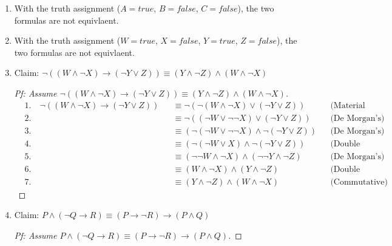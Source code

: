 \documentclass{article}
\begin{document}
\begin{enumerate}
\begin{enumerate}
\begin{proof}[Pf: Assume $(A \rightarrow B) \rightarrow C \equiv (\neg A \rightarrow C) \land (B \rightarrow C)$]
\begin{align*}
                &5. \quad && \equiv (A \lor C) \land (\neg B \lor C) && \text{(Double Negation)} \\
                &6. \quad && \equiv (A \land \neg B) \lor C && \text{(Distributive)}
            \end{align*}
        \end{proof}
        \item With the truth assignment ($A = true$, $B = false$, $C = false$), the two formulas are not equivlaent.
        \item With the truth assignment ($W = true$, $X = false$, $Y = true$, $Z = false$), the two formulas are not equivlaent.
        \item
        Claim: $\neg ((W \land \neg X) \rightarrow (\neg Y \lor Z)) \equiv (Y \land \neg Z) \land (W \land \neg X)$
        \begin{proof}[Pf: Assume $\neg ((W \land \neg X) \rightarrow (\neg Y \lor Z)) \equiv (Y \land \neg Z) \land (W \land \neg X)$]
            \begin{align*}
                &1. \quad \neg ((W \land \neg X) \rightarrow (\neg Y \lor Z)) && \equiv \neg (\neg (W \land \neg X) \lor (\neg Y \lor Z)) && \text{(Material Implication)} \\
                &2. \quad && \equiv \neg ((\neg W \lor \neg \neg X) \lor (\neg Y \lor Z)) && \text{(De Morgan's)} \\
                &3. \quad && \equiv (\neg (\neg W \lor \neg \neg X) \land \neg (\neg Y \lor Z)) && \text{(De Morgan's)} \\
                &4. \quad && \equiv (\neg (\neg W \lor X) \land \neg (\neg Y \lor Z)) && \text{(Double Negation)} \\
                &5. \quad && \equiv (\neg \neg W \land \neg X) \land (\neg \neg Y \land \neg Z) && \text{(De Morgan's)} \\
                &6. \quad && \equiv (W \land \neg X) \land (Y \land \neg Z) && \text{(Double Negation)} \\
                &7. \quad && \equiv (Y \land \neg Z) \land (W \land \neg X) && \text{(Commutative)}
            \end{align*}
        \end{proof}
        \item
        Claim: $P \land (\neg Q \rightarrow R) \equiv (P \rightarrow \neg R) \rightarrow (P \land Q)$
        \begin{proof}[Pf: Assume $P \land (\neg Q \rightarrow R) \equiv (P \rightarrow \neg R) \rightarrow (P \land Q)$]

\end{proof}
\end{enumerate}
\end{enumerate}
\end{document}
